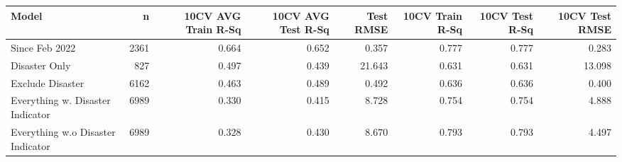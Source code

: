 
\begin{tabular}{l|r|r|r|r|r|r|r}
\hline
Model & n & 10CV AVG Train R-Sq & 10CV AVG Test R-Sq & Test RMSE & 10CV Train R-Sq & 10CV Test R-Sq & 10CV Test RMSE\\
\hline
Since Feb 2022 & 2361 & 0.664 & 0.652 & 0.357 & 0.777 & 0.777 & 0.283\\
\hline
Disaster Only & 827 & 0.497 & 0.439 & 21.643 & 0.631 & 0.631 & 13.098\\
\hline
Exclude Disaster & 6162 & 0.463 & 0.489 & 0.492 & 0.636 & 0.636 & 0.400\\
\hline
Everything w. Disaster Indicator & 6989 & 0.330 & 0.415 & 8.728 & 0.754 & 0.754 & 4.888\\
\hline
Everything w.o Disaster Indicator & 6989 & 0.328 & 0.430 & 8.670 & 0.793 & 0.793 & 4.497\\
\hline
\end{tabular}
